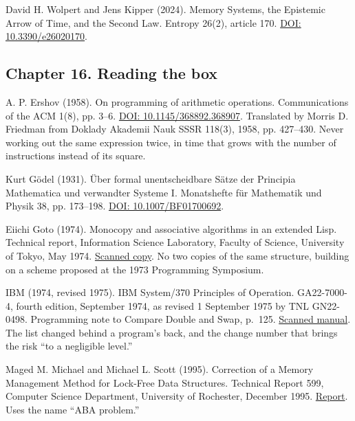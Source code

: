 \noindent David H. Wolpert and Jens Kipper (2024). Memory Systems, the Epistemic Arrow of Time, and the Second Law. Entropy 26(2), article 170. \href{https://doi.org/10.3390/e26020170}{DOI: 10.3390/e26020170}.
\par\medskip

\subsection*{Chapter 16. Reading the box}

\noindent A. P. Ershov (1958). On programming of arithmetic operations. Communications of the ACM 1(8), pp. 3--6. \href{https://doi.org/10.1145/368892.368907}{DOI: 10.1145/368892.368907}. Translated by Morris D. Friedman from Doklady Akademii Nauk SSSR 118(3), 1958, pp. 427--430. Never working out the same expression twice, in time that grows with the number of instructions instead of its square.
\par\medskip

\noindent Kurt G\"odel (1931). \"Uber formal unentscheidbare S\"atze der Principia Mathematica und verwandter Systeme I. Monatshefte f\"ur Mathematik und Physik 38, pp. 173--198. \href{https://doi.org/10.1007/BF01700692}{DOI: 10.1007/BF01700692}.
\par\medskip

\noindent Eiichi Goto (1974). Monocopy and associative algorithms in an extended Lisp. Technical report, Information Science Laboratory, Faculty of Science, University of Tokyo, May 1974. \href{https://www.cs.utexas.edu/~hunt/research/hash-cons/hash-cons-papers/monocopy-goto.pdf}{Scanned copy}. No two copies of the same structure, building on a scheme proposed at the 1973 Programming Symposium.
\par\medskip

\noindent IBM (1974, revised 1975). IBM System/370 Principles of Operation. GA22-7000-4, fourth edition, September 1974, as revised 1 September 1975 by TNL GN22-0498. Programming note to Compare Double and Swap, p.~125. \href{https://ftp.mirrorservice.org/sites/www.bitsavers.org/pdf/ibm/370/princOps/GA22-7000-4_370_Principles_Of_Operation_Sep75.pdf}{Scanned manual}. The list changed behind a program's back, and the change number that brings the risk ``to a negligible level.''
\par\medskip

\noindent Maged M. Michael and Michael L. Scott (1995). Correction of a Memory Management Method for Lock-Free Data Structures. Technical Report 599, Computer Science Department, University of Rochester, December 1995. \href{https://www.cs.rochester.edu/u/scott/papers/1995_TR599.pdf}{Report}. Uses the name ``ABA problem.''
\par\medskip

